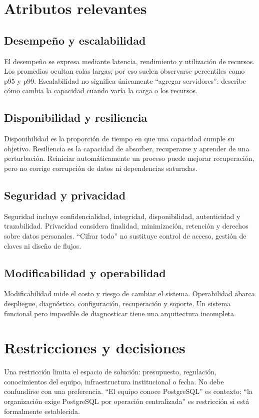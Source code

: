 \section{Atributos relevantes}
\subsection{Desempeño y escalabilidad}
El desempeño se expresa mediante latencia, rendimiento y utilización de recursos. Los promedios ocultan colas largas; por eso suelen observarse percentiles como p95 y p99. Escalabilidad no significa únicamente ``agregar servidores'': describe cómo cambia la capacidad cuando varía la carga o los recursos.

\subsection{Disponibilidad y resiliencia}
Disponibilidad es la proporción de tiempo en que una capacidad cumple su objetivo. Resiliencia es la capacidad de absorber, recuperarse y aprender de una perturbación. Reiniciar automáticamente un proceso puede mejorar recuperación, pero no corrige corrupción de datos ni dependencias saturadas.

\subsection{Seguridad y privacidad}
Seguridad incluye confidencialidad, integridad, disponibilidad, autenticidad y trazabilidad. Privacidad considera finalidad, minimización, retención y derechos sobre datos personales. ``Cifrar todo'' no sustituye control de acceso, gestión de claves ni diseño de flujos.

\subsection{Modificabilidad y operabilidad}
Modificabilidad mide el costo y riesgo de cambiar el sistema. Operabilidad abarca despliegue, diagnóstico, configuración, recuperación y soporte. Un sistema funcional pero imposible de diagnosticar tiene una arquitectura incompleta.

\section{Restricciones y decisiones}
Una restricción limita el espacio de solución: presupuesto, regulación, conocimientos del equipo, infraestructura institucional o fecha. No debe confundirse con una preferencia. ``El equipo conoce PostgreSQL'' es contexto; ``la organización exige PostgreSQL por operación centralizada'' es restricción si está formalmente establecida.

